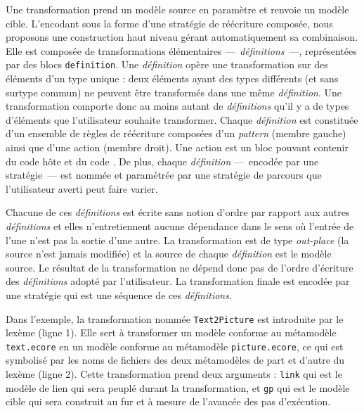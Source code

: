 Une transformation prend un modèle source en paramètre et renvoie un modèle
cible. L'encodant sous la forme d'une stratégie de réécriture composée, nous
proposons une construction haut niveau gérant automatiquement sa combinaison.
Elle est composée de transformations élémentaires ---~\emph{définitions}~---,
représentées par des blocs \texttt{definition}. Une \emph{définition} opère une
transformation sur des éléments d'un type unique : deux
éléments ayant des types différents (et sans surtype commun) ne peuvent être
transformés dans une même \emph{définition}. Une transformation comporte donc
au moins autant de \emph{définitions} qu'il y a de types d'éléments que
l'utilisateur souhaite transformer. Chaque \emph{définition} est constituée
d'un ensemble de règles de réécriture composées d'un \emph{pattern} (membre
gauche) ainsi que d'une action (membre droit). Une action est un bloc pouvant
contenir du code hôte et du code {\tom}. De plus, chaque \emph{définition}
---~encodée par une stratégie~--- est nommée et paramétrée par une stratégie de
parcours que l'utilisateur averti peut faire varier.

Chacune de ces \emph{définitions} est écrite sans notion d'ordre par rapport
aux autres \emph{définitions} et elles n'entretiennent aucune dépendance dans
le sens où l'entrée de l'une n'est pas la sortie d'une autre. La transformation
est de type \emph{out-place} (la source n'est jamais modifiée) et la source de
chaque \emph{définition} est le modèle source. Le résultat de la
transformation ne dépend donc pas de l'ordre d'écriture des \emph{définitions}
adopté par l'utilisateur. La transformation finale est encodée par une
stratégie qui est une séquence de ces \emph{définitions}.

%
%    
%


Dans l'exemple, la transformation nommée \texttt{Text2Picture} est introduite
par le lexème  (ligne 1). Elle sert à transformer un
modèle conforme au métamodèle \texttt{text.ecore} en un modèle conforme au
métamodèle \texttt{picture.ecore}, ce qui est symbolisé par les noms de
fichiers des deux métamodèles de part et d'autre du lexème \lex{\texttt{->}}
(ligne 2). %
Cette transformation prend deux arguments : \texttt{link} qui est le
modèle de lien qui sera peuplé durant la transformation, et \texttt{gp} qui est
le modèle cible qui sera construit au fur et à mesure de l'avancée des pas
d'exécution.

